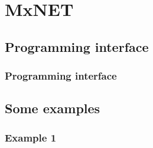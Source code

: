 
\section{MxNET}\label{sec:MxNet}

\subsection{Programming interface}

\begin{frame}
  \MyLogo
  \frametitle{Programming interface}  

\end{frame}

\subsection{Some examples}

\begin{frame}
  \MyLogo
  \frametitle{Example 1}  

\end{frame}